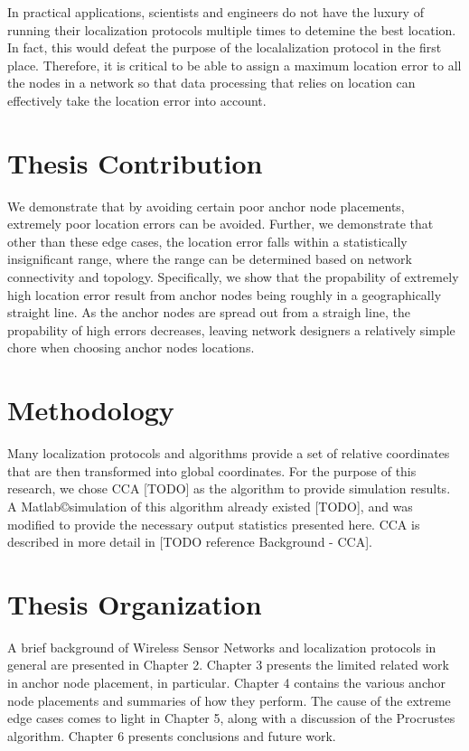In practical applications, scientists and engineers do not have the luxury of running their localization protocols multiple times to detemine the best location.  In fact, this would defeat the purpose of the localalization protocol in the first place.  Therefore, it is critical to be able to assign a maximum location error to all the nodes in a network so that data processing that relies on location can effectively take the location error into account.  

\section{Thesis Contribution}
We demonstrate that by avoiding certain poor anchor node placements, extremely poor location errors can be avoided.  Further, we demonstrate that other than these edge cases, the location error falls within a statistically insignificant range, where the range can be determined based on network connectivity and topology.  Specifically, we show that the propability of extremely high location error result from anchor nodes being roughly in a geographically straight line.  As the anchor nodes are spread out from a straigh line, the propability of high errors decreases, leaving network designers a relatively simple chore when choosing anchor nodes locations.

\section{Methodology}
Many localization protocols and algorithms provide a set of relative coordinates that are then transformed into global coordinates.  For the purpose of this research, we chose CCA [TODO] as the algorithm to provide simulation results.  A Matlab\copyright simulation of this algorithm already existed [TODO], and was modified to provide the necessary output statistics presented here.  CCA is described in more detail in [TODO reference Background - CCA].

\section{Thesis Organization}
A brief background of Wireless Sensor Networks and localization protocols in general are presented in Chapter 2.  Chapter 3 presents the limited related work in anchor node placement, in particular.  Chapter 4 contains the various anchor node placements and summaries of how they perform.  The cause of the extreme edge cases comes to light in Chapter 5, along with a discussion of the Procrustes algorithm.  Chapter 6 presents conclusions and future work.

